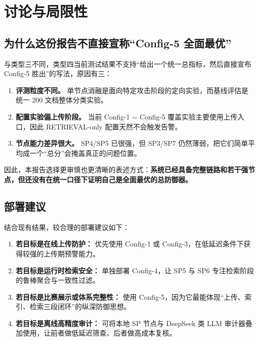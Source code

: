 \documentclass[11pt,a4paper]{ctexart}
\begin{document}
\section{讨论与局限性}

\subsection{为什么这份报告不直接宣称“Config-5 全面最优”}
与类型三不同，类型四当前测试结果不支持“给出一个统一总指标，然后直接宣布 Config-5 胜出”的写法，原因有三：
\begin{enumerate}[leftmargin=2em]
  \item \textbf{评测粒度不同。} 单节点消融是面向特定攻击阶段的定向实验，而基线评估是统一 200 文档整体分类实验。
  \item \textbf{配置实验偏上传阶段。} 当前 Config-1 $\sim$ Config-5 覆盖实验主要使用上传入口，因此 RE\-TRIE\-VAL-only 配置天然不会触发告警。
  \item \textbf{节点能力差异很大。} SP4/SP5 已很强，但 SP3/SP7 仍然薄弱，把它们简单平均成一个“总分”会掩盖真正的问题位置。
\end{enumerate}

因此，本报告选择更审慎也更清晰的表述方式：\textbf{系统已经具备完整链路和若干强节点，但还没有在统一口径下证明自己是全面最优的总防御器。}

\subsection{部署建议}
结合现有结果，较合理的部署建议如下：
\begin{enumerate}[leftmargin=2em]
  \item \textbf{若目标是在线上传防护：} 优先使用 Config-1 或 Config-3，在低延迟条件下获得较强的上传期预警能力。
  \item \textbf{若目标是运行时检索安全：} 单独部署 Config-4，让 SP5 与 SP6 专注检索阶段的鲁棒聚合与一致性过滤。
  \item \textbf{若目标是比赛展示或体系完整性：} 使用 Config-5，因为它最能体现“上传、索引、检索三段闭环”的纵深防御思想。
  \item \textbf{若目标是离线高精度审计：} 可将本地 SP 节点与 DeepSeek 类 LLM 审计器叠加使用，让前者做低延迟筛查、后者做高成本复核。
\end{enumerate}
\end{document}
